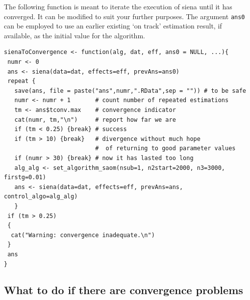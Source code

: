 \documentclass[a4paper,fleqn,11pt]{article}
\newcommand{\+}{\, + \,}
\newcommand{\sfn}[1]{\textsf{#1}}
\begin{document}
The following function is meant to
iterate the execution of \sfn{siena} until it has converged.
It can be modified to suit your further purposes.
The argument \texttt{ans0} can be employed to use an earlier existing
`on track' estimation result, if available, as the initial value
for the algorithm.

\begin{verbatim}
sienaToConvergence <- function(alg, dat, eff, ans0 = NULL, ...){
 numr <- 0
 ans <- siena(data=dat, effects=eff, prevAns=ans0)
 repeat {
   save(ans, file = paste("ans",numr,".RData",sep = "")) # to be safe
   numr <- numr + 1       # count number of repeated estimations
   tm <- ans$tconv.max    # convergence indicator
   cat(numr, tm,"\n")     # report how far we are
   if (tm < 0.25) {break} # success
   if (tm > 10) {break}   # divergence without much hope
                          #  of returning to good parameter values
   if (numr > 30) {break} # now it has lasted too long
   alg_alg <- set_algorithm_saom(nsub=1, n2start=2000, n3=3000, firstg=0.01)
   ans <- siena(data=dat, effects=eff, prevAns=ans, control_algo=alg_alg)
   }
 if (tm > 0.25)
 {
  cat("Warning: convergence inadequate.\n")
 }
 ans
}
\end{verbatim}


\subsection{What to do if there are convergence problems}
\label{S_conv}
\end{document}
